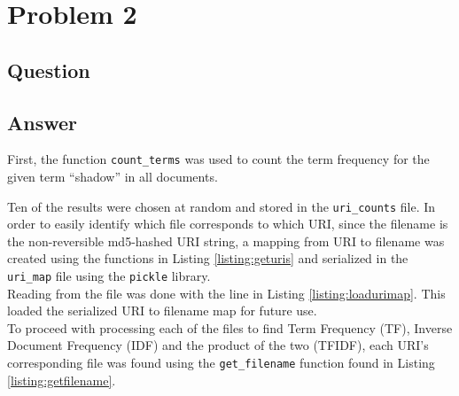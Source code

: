 \section{Problem 2}

\subsection{Question}



\subsection{Answer}
\vspace{2mm}
First, the function {\tt count\_terms} was used to count the term frequency for the given term ``shadow'' in all documents.

\newpage
\vspace{5mm}


Ten of the results were chosen at random and stored in the {\tt uri\_counts} file. In order to easily identify which file corresponds to which URI, since the filename is the non-reversible md5-hashed URI string, a mapping from URI to filename was created using the functions in Listing \ref{listing:geturis} and serialized in the {\tt uri\_map} file using the {\tt pickle} library.\\



Reading from the file was done with the line in Listing \ref{listing:loadurimap}. This loaded the serialized URI to filename map for future use.\\



To proceed with processing each of the files to find Term Frequency (TF), Inverse Document Frequency (IDF) and the product of the two (TFIDF), each URI's corresponding file was found using the {\tt get\_filename} function found in Listing \ref{listing:getfilename}.\\



